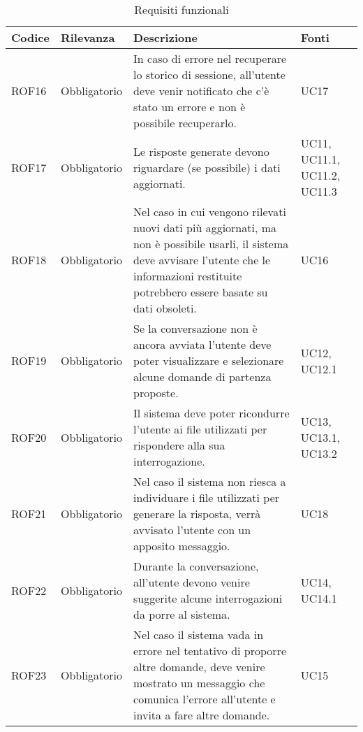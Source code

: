     \vspace{0.5cm}
    \newpage
    \begin{table}[h!]
    \renewcommand{\arraystretch}{1.6} %
    \begin{tabularx}{\textwidth}{|p{2cm}|p{3cm}|X|p{4cm}|} \hline
    \rowcolor[HTML]{FFD700} 
    \textbf{Codice} & \textbf{Rilevanza} & \textbf{Descrizione} & \textbf{Fonti} \\ \hline
    ROF16 & Obbligatorio & In caso di errore nel recuperare lo storico di sessione, all'utente deve venir notificato che c'è stato un errore e non è possibile recuperarlo. & UC17 \\ \hline
    ROF17 & Obbligatorio & Le risposte generate devono riguardare (se possibile) i dati aggiornati. & UC11, UC11.1, UC11.2, UC11.3 \\ \hline
    ROF18 & Obbligatorio & Nel caso in cui vengono rilevati nuovi dati più aggiornati, ma non è possibile usarli, il sistema deve avvisare l'utente che le informazioni restituite potrebbero essere basate su dati obsoleti. & UC16 \\ \hline
    ROF19 & Obbligatorio & Se la conversazione non è ancora avviata l'utente deve poter visualizzare e selezionare alcune domande di partenza proposte. & UC12, UC12.1 \\ \hline
    ROF20 & Obbligatorio & Il sistema deve poter ricondurre l'utente ai file utilizzati per rispondere alla sua interrogazione. & UC13, UC13.1, UC13.2 \\ \hline
    ROF21 & Obbligatorio & Nel caso il sistema non riesca a individuare i file utilizzati per generare la risposta, verrà avvisato l'utente con un apposito messaggio. & UC18 \\ \hline
    ROF22 & Obbligatorio & Durante la conversazione, all'utente devono venire suggerite alcune interrogazioni da porre al sistema. & UC14, UC14.1 \\ \hline
    ROF23 & Obbligatorio & Nel caso il sistema vada in errore nel tentativo di proporre altre domande, deve venire mostrato un messaggio che comunica l'errore all'utente e invita a fare altre domande. & UC15 \\ \hline
    \end{tabularx}

    \caption{Requisiti funzionali}
    \label{tab:Requisiti_funzionali}
\end{table}


\newpage
